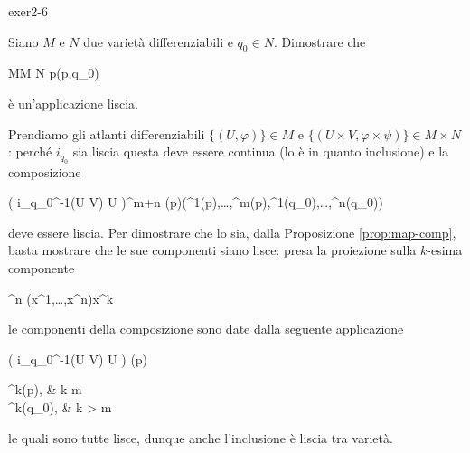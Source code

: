 {exer2-6}
{
Siano $ M $ e $ N $ due varietà differenziabili e $ q_{0} \in N $. Dimostrare che

	{M}{M \times N}
	{p}{(p,q_{0})}

è un'applicazione liscia.
}
{
Prendiamo gli atlanti differenziabili $ \{(U,\varphi)\} \in M $ e $ \{(U \times V,\varphi \times \psi)\} \in M \times N $: perché $ i_{q_{0}} $ sia liscia questa deve essere continua (lo è in quanto inclusione) e la composizione

	{\varphi( i_{q_{0}}^{-1}(U \times V) \cap U )}{\R^{m+n}}
	{\varphi(p)}{(\varphi^{1}(p),\dots,\varphi^{m}(p),\psi^{1}(q_{0}),\dots,\psi^{n}(q_{0}))}

deve essere liscia. Per dimostrare che lo sia, dalla Proposizione \ref{prop:map-comp}, basta mostrare che le sue componenti siano lisce: presa la proiezione sulla $ k $-esima componente

	{\R^{n}}{\R}
	{(x^{1},\dots,x^{n})}{x^{k}}

le componenti della composizione sono date dalla seguente applicazione

	{\varphi( i_{q_{0}}^{-1}(U \times V) \cap U )}{\R}
	{\varphi(p)}{%
					\begin{cases}
						\varphi^{k}(p), & k \leqslant m \\
						\psi^{k}(q_{0}), & k > m
					\end{cases}%
					}

le quali sono tutte lisce, dunque anche l'inclusione è liscia tra varietà.
}


